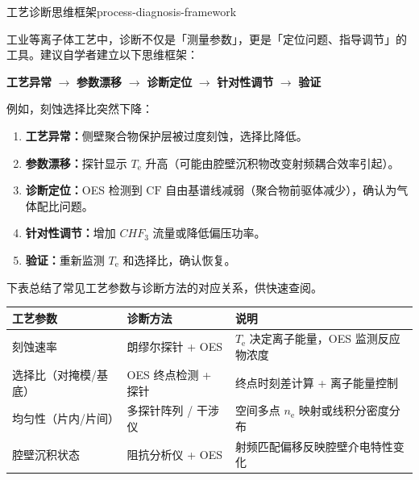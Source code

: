 \documentclass[12pt,a4paper,openany,oneside]{book}
\newcommand{\diffmarktext}[1]{%
  \textcolor{coverMid!80}{\rule[-0.1em]{2pt}{0.9em}}\,%
  \textcolor{coverMid}{\footnotesize\textbf{[#1]}}%
}
\newcommand{\difficulty}[1]{\marginnote{\raggedright\diffmarktext{#1}}}
\newcommand{\ee}{\mathrm{e}}
\begin{document}
\begin{insight}{工艺诊断思维框架}{process-diagnosis-framework}
\difficulty{提高}

工业等离子体工艺中，诊断不仅是「测量参数」，更是「定位问题、指导调节」的工具。建议自学者建立以下思维框架：

\begin{center}
\textbf{工艺异常} $\longrightarrow$ \textbf{参数漂移} $\longrightarrow$ \textbf{诊断定位} $\longrightarrow$ \textbf{针对性调节} $\longrightarrow$ \textbf{验证}
\end{center}

例如，刻蚀选择比突然下降：
\begin{enumerate}
\item \textbf{工艺异常：}侧壁聚合物保护层被过度刻蚀，选择比降低。
\item \textbf{参数漂移：}探针显示 $T_\ee$ 升高（可能由腔壁沉积物改变射频耦合效率引起）。
\item \textbf{诊断定位：}OES 检测到 $\mathrm{CF}$ 自由基谱线减弱（聚合物前驱体减少），确认为气体配比问题。
\item \textbf{针对性调节：}增加 $CHF_3$ 流量或降低偏压功率。
\item \textbf{验证：}重新监测 $T_\ee$ 和选择比，确认恢复。
\end{enumerate}

下表总结了常见工艺参数与诊断方法的对应关系，供快速查阅。

\begin{center}
\begin{tabular}{@{}llp{5cm}@{}}
\toprule
\textbf{工艺参数} & \textbf{诊断方法} & \textbf{说明} \\
\midrule
刻蚀速率 & 朗缪尔探针 + OES & $T_\ee$ 决定离子能量，OES 监测反应物浓度 \\
选择比（对掩模/基底） & OES 终点检测 + 探针 & 终点时刻差计算 + 离子能量控制 \\
均匀性（片内/片间） & 多探针阵列 / 干涉仪 & 空间多点 $n_\ee$ 映射或线积分密度分布 \\
腔壁沉积状态 & 阻抗分析仪 + OES & 射频匹配偏移反映腔壁介电特性变化 \\
\bottomrule
\end{tabular}
\end{center}


\end{insight}
\end{document}
